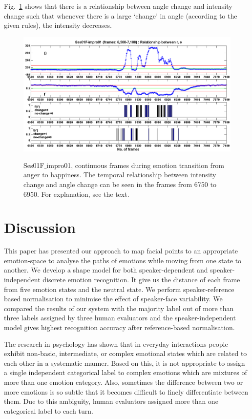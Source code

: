 \documentclass[10pt,journal,cspaper,compsoc]{IEEEtran}
\begin{document}
Fig.~\ref{fig_controlchart} shows that there is a relationship between angle change and intensity change such that whenever there is a large `change' in angle (according to the given rules), the intensity decreases.

\begin{figure}[!t]
\begin{center}
{
\centering
\includegraphics[width=1\textwidth]{figures/Ch7/6750_6950_change_1.png}
}
\end{center}
\caption{Ses01F$\_$impro01, continuous frames during emotion transition from anger to happiness. The temporal relationship between intensity change and angle change can be seen in the frames from 6750 to 6950. For explanation, see the text.}
\label{fig_controlchart}
\end{figure}

\section{Discussion}
\label{sec_discussion}

This paper has presented our approach to map facial points to an appropriate emotion-space to analyse the paths of emotions while moving from one state to another. We develop a shape model for both speaker-dependent and speaker-independent discrete emotion recognition. It give us the distance of each frame from five emotion states and the neutral state. We perform speaker-reference based normalisation to minimise the effect of speaker-face variability. We compared the results of our system with the majority label out of more than three labels assigned by three human evaluators and the speaker-independent model gives highest recognition accuracy after reference-based normalisation.

The research in psychology has shown that in everyday interactions people exhibit non-basic, intermediate, or complex emotional states which are related to each other in a systematic manner. Based on this, it is not appropriate to assign a single independent categorical label to complex emotions which are mixtures of more than one emotion category. Also, sometimes the difference between two or more emotions is so subtle that it becomes difficult to finely differentiate between them. Due to this ambiguity, human evaluators assigned more than one categorical label to each turn.
\end{document}
